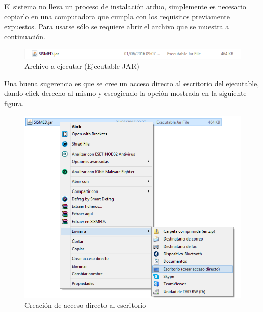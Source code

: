 El sistema no lleva un proceso de instalaci\'on arduo, simplemente es necesario copiarlo en una computadora que cumpla con los requisitos previamente expuestos. Para usarse s\'olo se requiere abrir el archivo que se muestra a continuaci\'on.
\begin{figure}[htbp!]
\centering
		\includegraphics[width=.8\textwidth]{images/archivo}
		\caption{Archivo a ejecutar (Ejecutable JAR)}
	\end{figure}
	
Una buena sugerencia es que se cree un acceso directo al escritorio del ejecutable, dando click derecho al mismo y escogiendo la opci\'on mostrada en la siguiente figura.

\begin{figure}[htbp!]
\centering
		\includegraphics[width=.8\textwidth]{images/acceso}
		\caption{Creaci\'on de acceso directo al escritorio}
	\end{figure}
